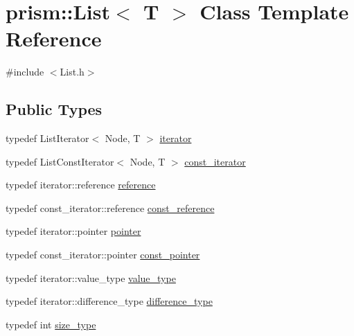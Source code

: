\hypertarget{classprism_1_1_list}{}\section{prism\+:\+:List$<$ T $>$ Class Template Reference}
\label{classprism_1_1_list}


{\ttfamily \#include $<$List.\+h$>$}

\subsection*{Public Types}
\begin{DoxyCompactItemize}
\item 
typedef List\+Iterator$<$ Node, T $>$ \hyperlink{classprism_1_1_list_a6cf00c98a428ed325fe9ccc60d7ef95a}{iterator}
\item 
typedef List\+Const\+Iterator$<$ Node, T $>$ \hyperlink{classprism_1_1_list_a038bd36af263a85110467528db8305d5}{const\+\_\+iterator}
\item 
typedef iterator\+::reference \hyperlink{classprism_1_1_list_aace7abca3cacb471bba9f04bba680fc3}{reference}
\item 
typedef const\+\_\+iterator\+::reference \hyperlink{classprism_1_1_list_a908620eac035bd6d020d69919aeffcbe}{const\+\_\+reference}
\item 
typedef iterator\+::pointer \hyperlink{classprism_1_1_list_aed257df5c1db1015841de21318b6c5c2}{pointer}
\item 
typedef const\+\_\+iterator\+::pointer \hyperlink{classprism_1_1_list_ab7be76433c8a90f198e268a0918e8a6b}{const\+\_\+pointer}
\item 
typedef iterator\+::value\+\_\+type \hyperlink{classprism_1_1_list_a7f20672ea7b8f748420548308e07dbc1}{value\+\_\+type}
\item 
typedef iterator\+::difference\+\_\+type \hyperlink{classprism_1_1_list_a98f5a94db7ed98f032ee32ee34bbc8c8}{difference\+\_\+type}
\item 
typedef int \hyperlink{classprism_1_1_list_a1d3fe26a6fe0ec8f6a63e70bb59979bd}{size\+\_\+type}
\end{DoxyCompactItemize}
